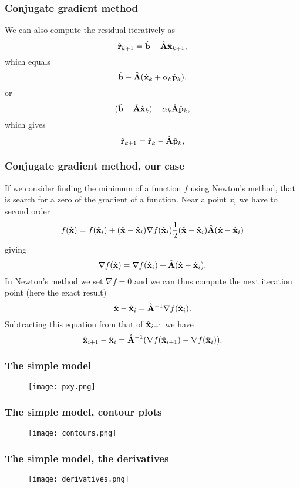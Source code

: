 \frame
{
  \frametitle{Conjugate gradient method}
\begin{small}
{\scriptsize
We can also  compute the residual iteratively as
\[
\hat{\bf {r}}_{k+1}=\hat{\bf {b}}-\hat{\bf {A}}\hat{\bf {x}}_{k+1},
 \]
which equals
\[
\hat{\bf {b}}-\hat{\bf {A}}(\hat{\bf {x}}_k+\alpha_k\hat{\bf {p}}_k),
 \]
or
\[
(\hat{\bf {b}}-\hat{\bf {A}}\hat{\bf {x}}_k)-\alpha_k\hat{\bf {A}}\hat{\bf {p}}_k,
 \]
which gives
\[
\hat{\bf {r}}_{k+1}=\hat{\bf {r}}_k-\hat{\bf {A}}\hat{\bf {p}}_{k},
 \]
}
\end{small}
}



\frame
{
  \frametitle{Conjugate gradient method, our case}
\begin{small}
{\scriptsize
If we consider finding the minimum of a function $f$ using Newton's method,
that is search for a zero of the gradient of a function.  Near a point $x_i$
we have to second order
\[
f(\hat{\bf {x}})=f(\hat{\bf {x}}_i)+(\hat{\bf {x}}-\hat{\bf {x}}_i)\nabla f(\hat{\bf {x}}_i)
\frac{1}{2}(\hat{\bf {x}}-\hat{\bf {x}}_i)\hat{\bf {A}}(\hat{\bf {x}}-\hat{\bf {x}}_i)
\]
giving
\[
\nabla f(\hat{\bf {x}})=\nabla f(\hat{\bf {x}}_i)+\hat{\bf {A}}(\hat{\bf {x}}-\hat{\bf {x}}_i).
 \]
In Newton's method we set $\nabla f = 0$ and we can thus compute the next iteration point
(here the exact result)
\[
\hat{\bf {x}}-\hat{\bf {x}}_i=\hat{\bf {A}}^{-1}\nabla f(\hat{\bf {x}}_i).
\]
Subtracting this equation from that of $\hat{\bf {x}}_{i+1}$ we have
\[
\hat{\bf {x}}_{i+1}-\hat{\bf {x}}_i=\hat{\bf {A}}^{-1}(\nabla f(\hat{\bf {x}}_{i+1})-\nabla f(\hat{\bf {x}}_i)).
\]
}
\end{small}
}


\frame
{
  \frametitle{The simple model}
      \begin{figure}[htp]
        \texttt{[image: pxy.png]}
      \end{figure}
}


\frame
{
  \frametitle{The simple model, contour plots}
      \begin{figure}[htp]
        \texttt{[image: contours.png]}
      \end{figure}
}


\frame
{
  \frametitle{The simple model, the derivatives}
      \begin{figure}[htp]
        \texttt{[image: derivatives.png]}
      \end{figure}
}


